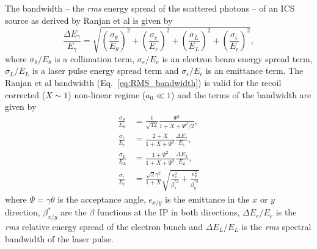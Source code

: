 \documentclass[../main.tex]{subfiles}
\begin{document}
The bandwidth -- the \textit{rms} energy spread of the scattered photons -- of an ICS source as derived by Ranjan et al \cite{ranjan2018simulation} is given by
\begin{equation}
\frac{\Delta E_{\gamma}}{E_{\gamma}} = \sqrt{\left(\frac{\sigma_{\theta}}{E_{\theta}}\right)^{2}+\left(\frac{\sigma_{e}}{E_{e}}\right)^{2}+\left(\frac{\sigma_{L}}{E_{L}}\right)^{2}+\left(\frac{\sigma_{\epsilon}}{E_{\epsilon}}\right)^{2}},
\label{eq:RMS_bandwidth}    
\end{equation}
where $\sigma_{\theta}/E_{\theta}$ is a collimation term, $\sigma_{e}/E_{e}$ is an electron beam energy spread term, $\sigma_{L}/E_{L}$ is a laser pulse energy spread term and $\sigma_{\epsilon}/E_{\epsilon}$ is an emittance term. The Ranjan et al bandwidth (Eq.~\ref{eq:RMS_bandwidth}) is valid for the recoil corrected ($X\sim 1$) non-linear regime ($a_{0}\ll 1$) and the terms of the bandwidth are given by
\begin{align}
\frac{\sigma_{\theta}}{E_{\theta}} &= \frac{1}{\sqrt{12}}\frac{\Psi^{2}}{1+X+\Psi^{2}/2},
\label{eq:collimation_term} \\
\frac{\sigma_{e}}{E_{e}} &= \frac{2+X}{1+X+\Psi^{2}}\frac{\Delta E_{e}}{E_{e}},
\label{eq:beam_energy_spread_term} \\
\frac{\sigma_{L}}{E_{L}} &= \frac{1+\Psi^{2}}{1+X+\Psi^{2}}\frac{\Delta E_{L}}{E_{L}},
\label{eq:laser_energy_spread_term} \\
\frac{\sigma_{\epsilon}}{E_{\epsilon}} &= \frac{\sqrt{2}\gamma^{2}}{1+X}\sqrt{\frac{\epsilon_{x}^{2}}{\beta_{x}^{*2}}+\frac{\epsilon_{y}^{2}}{\beta_{y}^{*2}}}
\label{eq:emittance_term}
\end{align}
where $\Psi = \gamma\theta$ is the acceptance angle, $\epsilon_{x/y}$ is the emittance in the $x$ or $y$ direction, $\beta_{x/y}^{*}$ are the $\beta$ functions at the IP in both directions, $\Delta E_{e}/E_{e}$ is the \textit{rms} relative energy spread of the electron bunch and $\Delta E_{L}/E_{L}$ is the \textit{rms} spectral bandwidth of the laser pulse.
\end{document}
